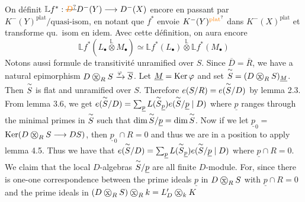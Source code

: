 On définit $\mathbb L f^*:\deleted{\unsure{D}}D^-(Y)\longrightarrow D^-(X)$ encore en passant par $K^-(Y)^{\mathrm{plat}}/\text{quasi-isom}$, en notant que $f^*$   envoie $K^-(Y)^{\unsure{\mathrm{plat}}}$ dans $K^-(X)^{\mathrm{plat}}$ et transforme qu.\ isom en idem. Avec cette définition, on aura encore
\[
\mathbb L f^*(L_{\bullet}\overset{\mathbb L}{\otimes}M_{\bullet})\simeq\mathbb L f^*(L_{\bullet})\overset{\mathbb L}{\otimes}\mathbb L f^*(M_{\bullet})
\]
Notons aussi formule de transitivité
unramified over $S$. Since $\overline D=\overline R$, we have a natural epimorphism
$D\mathbin{\ooalign{\hfil$\mathrm{x}$\hfil\cr\hfil$\handwritten{\bigcirc}$\hfil\cr}}_R S\xrightarrow{\handwritten{\varphi}}\overline S$. Let $\underline M=\mathrm{Ker}\,\varphi$ and set $\overset{\handwritten{\sim}}{S}=(D\mathbin{\ooalign{\hfil$\mathrm{x}$\hfil\cr\hfil$\handwritten{\bigcirc}$\hfil\cr}}_R S)_{\underline M}$. Then $\overset{\sim}{S}$ is flat and
unramified over $S$. Therefore $e(S/R)=e(\overset{\sim}{S}/D)$ by lemma 2.3. From
lemma 3.6, we get $e(\overset{\sim}{S}/D)=\sum_{\underline p}L(\overset{\sim}{S}_{\underline p})e(\overset{\sim}{S}/\underline p\mid D)$ where $\underline p$ ranges through the
minimal primes in $\overset{\sim}{S}$ such that $\dim \overset{\sim}{S}/\underline p=\dim \overset{\sim}{S}$. Now if we let $\underline p_0={}$
$\mathrm{Ker}(D\mathbin{\ooalign{\hfil$\mathrm{x}$\hfil\cr\hfil$\handwritten{\bigcirc}$\hfil\cr}}_R S\longrightarrow DS)$, then $\underline p_0\cap R=0$ and thus we are in a position to
apply lemma 4.5. Thus we have that $e(\overset{\sim}{S}/D)=\sum_{\underline p}L(\overset{\sim}{S}_{\underline p})e(\overset{\sim}{S}/\underline p\mid D)$ where
$\underline p\cap R=0$. We claim that the local $D$-algebras $\overset{\sim}{S}/\underline p$ are all finite $D$-module.
For, since there is one-one correspondence between the prime ideals $\underline p$ in
$D\mathbin{\ooalign{\hfil$\mathrm{x}$\hfil\cr\hfil$\handwritten{\bigcirc}$\hfil\cr}}_R S$ with $\underline p\cap R=0$ and the prime ideals in $(D\mathbin{\ooalign{\hfil$\mathrm{x}$\hfil\cr\hfil$\handwritten{\bigcirc}$\hfil\cr}}_R S)\mathbin{\ooalign{\hfil$\mathrm{x}$\hfil\cr\hfil$\handwritten{\bigcirc}$\hfil\cr}}_R k=L'_D\mathbin{\ooalign{\hfil$\mathrm{x}$\hfil\cr\hfil$\handwritten{\bigcirc}$\hfil\cr}}_k K$
